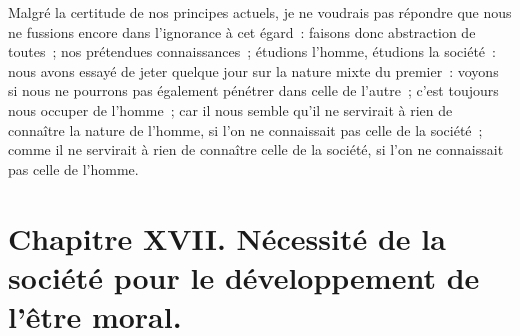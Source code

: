 \documentclass[french,twoside]{book} %
\newcommand\chapteropen{} %
\newcommand\chapterclose{} %
\begin{document}
Malgré la certitude de nos principes actuels, je ne voudrais pas répondre que nous ne fussions encore dans l’ignorance à cet égard : faisons donc abstraction de toutes ; nos prétendues connaissances ; étudions l’homme, étudions la société : nous avons essayé de jeter quelque jour sur la nature mixte du premier : voyons si nous ne pourrons pas également pénétrer dans celle de l’autre ; c’est toujours nous occuper de l’homme ; car il nous semble qu’il ne servirait à rien de connaître la nature de l’homme, si l’on ne connaissait pas celle de la société ; comme il ne servirait à rien de connaître celle de la société, si l’on ne connaissait pas celle de l’homme.
\chapterclose


\chapteropen
\chapter[{Chapitre XVII. Nécessité de la société pour le développement de l’être moral.}]{Chapitre XVII. Nécessité de la société pour le développement de l’être moral.}\renewcommand{\leftmark}{Chapitre XVII. Nécessité de la société pour le développement de l’être moral.}
\end{document}
